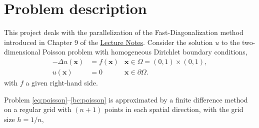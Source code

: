 \documentclass[onecolumn, oneside, a4paper, 11pt]{memoir}
\theoremstyle{remark}
\newcommand{\xx}{{\boldsymbol x}}
\begin{document}

\section{Problem description}

This project deals with the parallelization of the Fast-Diagonalization method introduced in Chapter 9 of the \href{http://thebb.github.io/TMA4280/notes.pdf}{Lecture Notes}.
Consider the solution $u$ to the two-dimensional Poisson problem with homogeneous Dirichlet boundary conditions,
\begin{align}
  \label{eq:poisson}  -\Delta u(\xx) &= f(\xx) & \xx \in \Omega = (0,1) \times (0,1), \\
  \label{bc:poisson}  u(\xx) &= 0 & \xx \in \partial\Omega.
\end{align}
with $f$ a given right-hand side.

\medskip
Problem \eqref{eq:poisson}--\eqref{bc:poisson} is approximated by a finite difference method on a regular grid with $(n+1)$ points in each spatial direction, with the grid size $h=1/n$,
\end{document}
